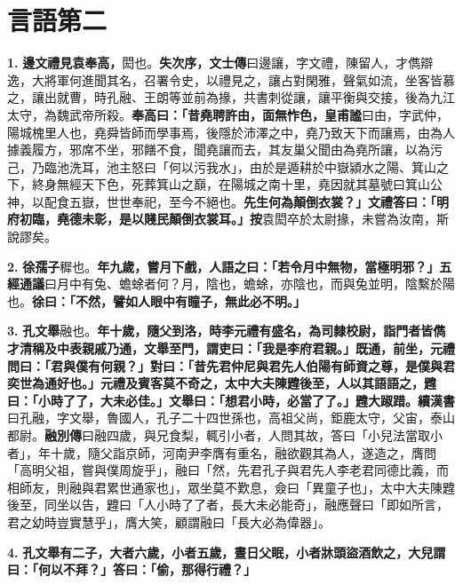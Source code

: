 \chapter{言語第二}

\textbf{1.} \textbf{邊文禮見袁奉高，}{\footnotesize 閎也。}\textbf{失次序，}{\footnotesize \textbf{文士傳}曰邊讓，字文禮，陳留人，才儁辯逸，大將軍何進聞其名，召署令史，以禮見之，讓占對閑雅，聲氣如流，坐客皆慕之，讓出就曹，時孔融、王朗等並前為掾，共書刺從讓，讓平衡與交接，後為九江太守，為魏武帝所殺。}\textbf{奉高曰：「昔堯聘許由，面無怍色，}{\footnotesize \textbf{皇甫謐}曰由，字武仲，陽城槐里人也，堯舜皆師而學事焉，後隱於沛澤之中，堯乃致天下而讓焉，由為人據義履方，邪席不坐，邪饍不食，聞堯讓而去，其友巢父聞由為堯所讓，以為污己，乃臨池洗耳，池主怒曰「何以污我水」，由於是遁耕於中嶽潁水之陽、箕山之下，終身無經天下色，死葬箕山之巔，在陽城之南十里，堯因就其墓號曰箕山公神，以配食五嶽，世世奉祀，至今不絕也。}\textbf{先生何為顛倒衣裳？」文禮答曰：「明府初臨，堯德未彰，是以賤民顛倒衣裳耳。」}{\footnotesize \textbf{按}袁閎卒於太尉掾，未嘗為汝南，斯說謬矣。}

\textbf{2.} \textbf{徐孺子}{\footnotesize 穉也。}\textbf{年九歲，嘗月下戲，人語之曰：「若令月中無物，當極明邪？」}{\footnotesize \textbf{五經通議}曰月中有兔、蟾蜍者何？月，陰也，蟾蜍，亦陰也，而與兔並明，陰繫於陽也。}\textbf{徐曰：「不然，譬如人眼中有瞳子，無此必不明。」}

\textbf{3.} \textbf{孔文舉}{\footnotesize 融也。}\textbf{年十歲，隨父到洛，時李元禮有盛名，為司隸校尉，詣門者皆儁才清稱及中表親戚乃通，文舉至門，謂吏曰：「我是李府君親。」既通，前坐，元禮問曰：「君與僕有何親？」對曰：「昔先君仲尼與君先人伯陽有師資之尊，是僕與君奕世為通好也。」元禮及賓客莫不奇之，太中大夫陳韙後至，人以其語語之，韙曰：「小時了了，大未必佳。」文舉曰：「想君小時，必當了了。」韙大踧踖。}{\footnotesize \textbf{續漢書}曰孔融，字文舉，魯國人，孔子二十四世孫也，高祖父尚，鉅鹿太守，父宙，泰山都尉。\textbf{融別傳}曰融四歲，與兄食梨，輒引小者，人問其故，答曰「小兒法當取小者」，年十歲，隨父詣京師，河南尹李膺有重名，融欲觀其為人，遂造之，膺問「高明父祖，嘗與僕周旋乎」，融曰「然，先君孔子與君先人李老君同德比義，而相師友，則融與君累世通家也」，眾坐莫不歎息，僉曰「異童子也」，太中大夫陳韙後至，同坐以告，韙曰「人小時了了者，長大未必能奇」，融應聲曰「即如所言，君之幼時豈實慧乎」，膺大笑，顧謂融曰「長大必為偉器」。}

\textbf{4.} \textbf{孔文舉有二子，大者六歲，小者五歲，晝日父眠，小者牀頭盜酒飲之，大兒謂曰：「何以不拜？」答曰：「偷，那得行禮？」}

